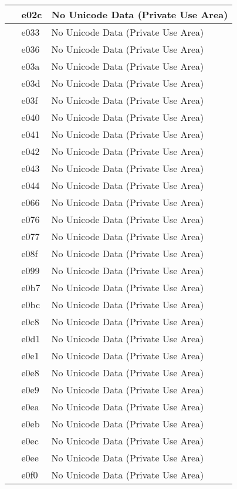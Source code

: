 \documentclass[12pt,letterpaper,openany]{book}
\begin{document}
\begin{center}
\begin{supertabular}{|m{0.25in}|m{0.5in}|m{4in}|}
 & e02c & No Unicode Data (Private Use Area)\\\hline
 & e033 & No Unicode Data (Private Use Area)\\\hline
 & e036 & No Unicode Data (Private Use Area)\\\hline
 & e03a & No Unicode Data (Private Use Area)\\\hline
 & e03d & No Unicode Data (Private Use Area)\\\hline
 & e03f & No Unicode Data (Private Use Area)\\\hline
 & e040 & No Unicode Data (Private Use Area)\\\hline
 & e041 & No Unicode Data (Private Use Area)\\\hline
 & e042 & No Unicode Data (Private Use Area)\\\hline
 & e043 & No Unicode Data (Private Use Area)\\\hline
 & e044 & No Unicode Data (Private Use Area)\\\hline
 & e066 & No Unicode Data (Private Use Area)\\\hline
 & e076 & No Unicode Data (Private Use Area)\\\hline
 & e077 & No Unicode Data (Private Use Area)\\\hline
 & e08f & No Unicode Data (Private Use Area)\\\hline
 & e099 & No Unicode Data (Private Use Area)\\\hline
 & e0b7 & No Unicode Data (Private Use Area)\\\hline
 & e0bc & No Unicode Data (Private Use Area)\\\hline
 & e0c8 & No Unicode Data (Private Use Area)\\\hline
 & e0d1 & No Unicode Data (Private Use Area)\\\hline
 & e0e1 & No Unicode Data (Private Use Area)\\\hline
 & e0e8 & No Unicode Data (Private Use Area)\\\hline
 & e0e9 & No Unicode Data (Private Use Area)\\\hline
 & e0ea & No Unicode Data (Private Use Area)\\\hline
 & e0eb & No Unicode Data (Private Use Area)\\\hline
 & e0ec & No Unicode Data (Private Use Area)\\\hline
 & e0ee & No Unicode Data (Private Use Area)\\\hline
 & e0f0 & No Unicode Data (Private Use Area)\\\hline

\end{supertabular}
\end{center}
\end{document}
